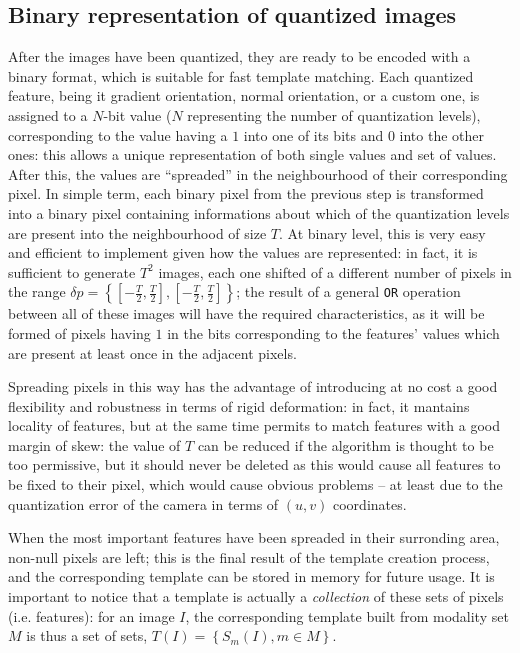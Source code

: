 \subsection{Binary representation of quantized images} \label{sec:linemod-binary}
After the images have been quantized, they are ready to be encoded
with a binary format, which is suitable for fast template
matching. Each quantized feature, being it gradient orientation,
normal orientation, or a custom one, is assigned to a $N$-bit value
($N$ representing the number of quantization levels), corresponding to
the value having a $1$ into one of its bits and $0$ into the other
ones: this allows a unique representation of both single values and
set of values. After this,
the values are ``spreaded'' in the neighbourhood of their corresponding
pixel. In simple term, each binary pixel from the previous step is
transformed into a binary pixel containing informations about which of
the quantization levels are present into the neighbourhood of size
$T$. At binary level, this is very easy and efficient to implement
given how the values are represented: in fact, it is sufficient to
generate $T^2$ images, each one shifted of a different number of
pixels in the range $\delta p = \left\{\left[-\frac{T}{2},
  \frac{T}{2}\right], \left[-\frac{T}{2},
  \frac{T}{2}\right]\right\}$; the result of a general \texttt{OR}
operation between all of these images will have the required
characteristics, as it will be formed of pixels having $1$ in the bits
corresponding to the features' values which are present at least once in
the adjacent pixels.

Spreading pixels in this way has the advantage of introducing at no
cost a good flexibility and robustness in terms of rigid deformation:
in fact, it mantains locality of features, but at the same time
permits to match features with a good margin of skew: the value of $T$
can be reduced if the algorithm is thought to be too permissive, but
it should never be deleted as this would cause all features to be
fixed to their pixel, which would cause obvious problems -- at least
due to the quantization error of the camera in terms of $(u,v)$
coordinates.

When the most important features have been spreaded in their surronding
area, non-null pixels are left; this is the final result of the
template creation process, and the corresponding template can be
stored in memory for future usage. It is important to notice that a
template is actually a \emph{collection} of these sets of pixels
(i.e. features): for an image $I$, the corresponding template built
from modality set $M$ is thus a set of sets, $T(I) = \left\{ S_m(I), m \in M \right\}$.

